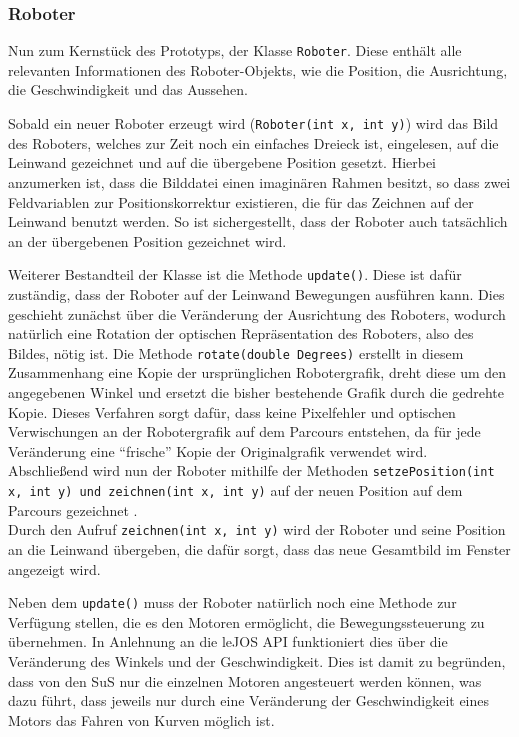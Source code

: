 \documentclass[paper=a4, pagesize, DIV=calc, BCOR=15mm, twoside=on, onecolumn=on, open = right, titlepage =on, parskip =half-, headsepline = on, footsepline = on, chapterprefix = on, appendixprefix = off, fontsize = 12pt, numbers = noenddot, abstract = on]{scrbook}
\numberwithin{equation}{chapter}
\theoremstyle{definition}
\theoremstyle{plain}
\theoremstyle{plain}
\theoremstyle{remark}
\theoremstyle{plain}
\theoremstyle{plain}
\begin{document}
\subsubsection{Roboter}
Nun zum Kernstück des Prototyps, der Klasse \texttt{Roboter}. Diese enthält alle relevanten Informationen des Roboter-Objekts, wie die Position, die Ausrichtung, die Geschwindigkeit und das Aussehen.

Sobald ein neuer Roboter erzeugt wird (\texttt{Roboter(int x, int y)}) wird das Bild des Roboters, welches zur Zeit noch ein einfaches Dreieck ist, eingelesen, auf die Leinwand gezeichnet und auf die übergebene Position gesetzt. Hierbei anzumerken ist, dass die Bilddatei einen imaginären Rahmen besitzt, so dass zwei Feldvariablen zur Positionskorrektur existieren, die für das Zeichnen auf der Leinwand benutzt werden. So ist sichergestellt, dass der Roboter auch tatsächlich an der übergebenen Position gezeichnet wird.

Weiterer Bestandteil der Klasse ist die Methode \texttt{update()}. Diese ist dafür zuständig, dass der Roboter auf der Leinwand Bewegungen ausführen kann. Dies geschieht zunächst über die Veränderung der Ausrichtung des Roboters, wodurch natürlich eine Rotation der optischen Repräsentation des Roboters, also des Bildes, nötig ist. Die Methode \texttt{rotate(double Degrees)} erstellt in diesem Zusammenhang eine Kopie der ursprünglichen Robotergrafik, dreht diese um den angegebenen Winkel und ersetzt die bisher bestehende Grafik durch die gedrehte Kopie. Dieses Verfahren sorgt dafür, dass keine Pixelfehler und optischen Verwischungen an der Robotergrafik auf dem Parcours entstehen, da für jede Veränderung eine "`frische"' Kopie der Originalgrafik verwendet wird.\\
Abschließend wird nun der Roboter mithilfe der Methoden \texttt{setzePosition(int x, int y) und \texttt{zeichnen(int x, int y)}} auf der neuen Position auf dem Parcours gezeichnet .\\
Durch den Aufruf \texttt{zeichnen(int x, int y)} wird der Roboter und seine Position an die Leinwand übergeben, die dafür sorgt, dass das neue Gesamtbild im Fenster angezeigt wird.

Neben dem \texttt{update()} muss der Roboter natürlich noch eine Methode zur Verfügung stellen, die es den Motoren ermöglicht, die Bewegungssteuerung zu übernehmen. In Anlehnung an die leJOS API funktioniert dies über die Veränderung des Winkels und der Geschwindigkeit. Dies ist damit zu begründen, dass von den SuS nur die einzelnen Motoren angesteuert werden können, was dazu führt, dass jeweils nur durch eine Veränderung der Geschwindigkeit eines Motors das Fahren von Kurven möglich ist.
\end{document}
